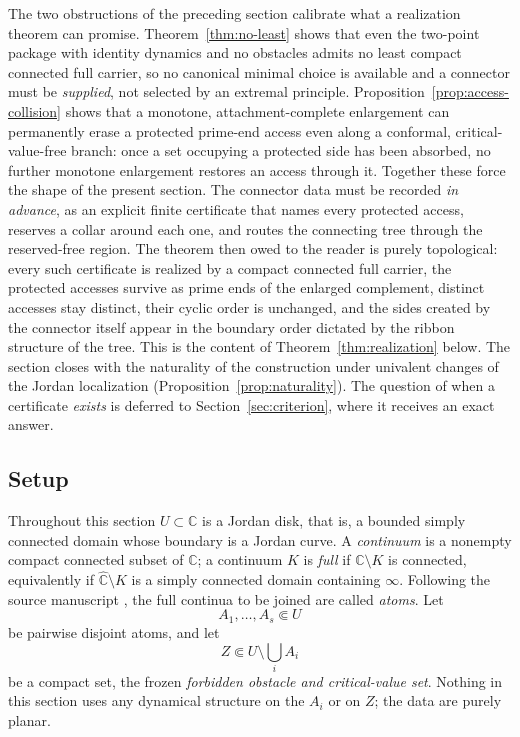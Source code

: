 \documentclass[11pt,reqno]{amsart}
\theoremstyle{definition}
\theoremstyle{remark}
\newcommand{\C}{\mathbb C}
\newcommand{\Chat}{\widehat{\mathbb C}}
\begin{document}
The two obstructions of the preceding section calibrate what a realization
theorem can promise.  Theorem~\ref{thm:no-least} shows that even the
two-point package with identity dynamics and no obstacles admits no least
compact connected full carrier, so no canonical minimal choice is available
and a connector must be \emph{supplied}, not selected by an extremal
principle.  Proposition~\ref{prop:access-collision} shows that a monotone,
attachment-complete enlargement can permanently erase a protected prime-end
access even along a conformal, critical-value-free branch: once a set
occupying a protected side has been absorbed, no further monotone
enlargement restores an access through it.  Together these force the shape
of the present section.  The connector data must be recorded \emph{in
advance}, as an explicit finite certificate that names every protected
access, reserves a collar around each one, and routes the connecting tree
through the reserved-free region.  The theorem then owed to the reader is
purely topological: every such certificate is realized by a compact
connected full carrier, the protected accesses survive as prime ends of the
enlarged complement, distinct accesses stay distinct, their cyclic order is
unchanged, and the sides created by the connector itself appear in the
boundary order dictated by the ribbon structure of the tree.  This is the
content of Theorem~\ref{thm:realization} below.  The section closes with
the naturality of the construction under univalent changes of the Jordan
localization (Proposition~\ref{prop:naturality}).  The question of when a
certificate \emph{exists} is deferred to
Section~\ref{sec:criterion}, where it receives an exact answer.

\subsection*{Setup}
Throughout this section $U\subset\C$ is a Jordan disk, that is, a bounded
simply connected domain whose boundary is a Jordan curve.  A
\emph{continuum} is a nonempty compact connected subset of $\C$; a
continuum $K$ is \emph{full} if $\C\setminus K$ is connected, equivalently
if $\Chat\setminus K$ is a simply connected domain containing $\infty$.
Following the source manuscript \cite{MWman}, the full continua to be
joined are called \emph{atoms}.  Let
\[
A_1,\dots,A_s\Subset U
\]
be pairwise disjoint atoms, and let
\[
Z\Subset U\setminus\bigcup_{i}A_i
\]
be a compact set, the frozen \emph{forbidden obstacle and critical-value
set}.  Nothing in this section uses any dynamical structure on the $A_i$ or
on $Z$; the data are purely planar.
\end{document}
